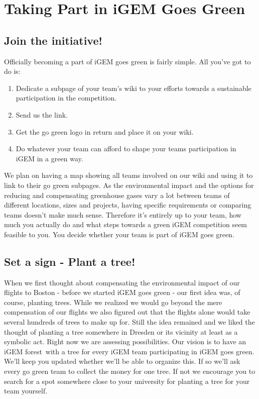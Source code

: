 
\chapter{Taking Part in iGEM Goes Green}\label{chap:takingpart}

\section{Join the initiative!}
Officially becoming a part of iGEM goes green is fairly simple. All you've got to do is:
\begin{enumerate}
	\item Dedicate a subpage of your team's wiki to your efforts towards a sustainable participation in the competition. 
	\item Send us the link.
	\item Get the go green logo in return and place it on your wiki.
	\item Do whatever your team can afford to shape your teams participation in iGEM in a green way.
\end{enumerate}
We plan on having a map showing all teams involved on our wiki and using it to link to their go green subpages. As the environmental impact and the options for reducing and compensating greenhouse gases vary a lot between teams of different locations, sizes and projects, having specific requirements or comparing teams doesn't make much sense. Therefore it's entirely up to your team, how much you actually do and what steps towards a green iGEM competition seem feasible to you. You decide whether your team is part of iGEM goes green.


\section{Set a sign - Plant a tree!}\label{sec:trees}

When we first thought about compensating the environmental impact of our flights to Boston - before we started iGEM goes green - our first idea was, of course, planting trees. While we realized we would go beyond the mere compensation of our flights we also figured out that the flights alone would take several hundreds of trees to make up for. Still the idea remained and we liked the thought of planting a tree somewhere in Dresden or its vicinity at least as a symbolic act. Right now we are assessing possibilities. Our vision is to have an \glqq iGEM forest\grqq\ with a tree for every iGEM team participating in iGEM goes green. We'll keep you updated whether we'll be able to organize this. If so we'll ask every go green team to collect the money for one tree. If not we encourage you to search for a spot somewhere close to your university for planting a tree for your team yourself.


